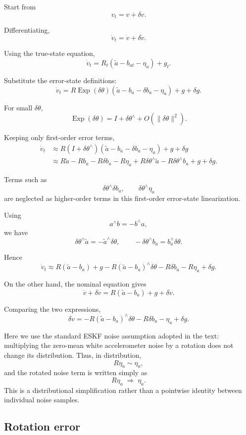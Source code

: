 \documentclass[11pt]{article}
\numberwithin{equation}{section}
\newcommand{\Exp}{\operatorname{Exp}}
\begin{document}
Start from
\[
v_t=v+\delta v.
\]

Differentiating,
\[
\dot v_t=\dot v+\delta\dot v.
\]

Using the true-state equation,
\[
\dot v_t
=
R_t(\tilde a-b_{at}-\eta_a)+g_t.
\]

Substitute the error-state definitions:
\[
\dot v_t
=
R\Exp(\delta\theta)
(\tilde a-b_a-\delta b_a-\eta_a)
+g+\delta g.
\]

For small $\delta\theta$,
\[
\Exp(\delta\theta)
=
I+\delta\theta^\wedge
+O(\|\delta\theta\|^2).
\]

Keeping only first-order error terms,
\begin{align}
\dot v_t
&\approx
R(I+\delta\theta^\wedge)
(\tilde a-b_a-\delta b_a-\eta_a)
+g+\delta g\\
&\approx
R\tilde a-Rb_a-R\delta b_a-R\eta_a
+R\delta\theta^\wedge\tilde a
-R\delta\theta^\wedge b_a
+g+\delta g.
\end{align}

Terms such as
\[
\delta\theta^\wedge\delta b_a,
\qquad
\delta\theta^\wedge\eta_a
\]
are neglected as higher-order terms in this first-order error-state
linearization.

Using
\[
a^\wedge b=-b^\wedge a,
\]
we have
\[
\delta\theta^\wedge\tilde a
=
-\tilde a^\wedge\delta\theta,
\qquad
-\delta\theta^\wedge b_a
=
b_a^\wedge\delta\theta.
\]

Hence
\[
\dot v_t
\approx
R(\tilde a-b_a)+g
-R(\tilde a-b_a)^\wedge\delta\theta
-R\delta b_a
-R\eta_a
+\delta g.
\]

On the other hand, the nominal equation gives
\[
\dot v+\delta\dot v
=
R(\tilde a-b_a)+g+\delta\dot v.
\]

Comparing the two expressions,
\begin{equation}
\boxed{
\delta\dot v
=
-R(\tilde a-b_a)^\wedge\delta\theta
-R\delta b_a
-\eta_a
+\delta g.
}
\end{equation}

Here we use the standard ESKF noise assumption adopted in the text:
multiplying the zero-mean white accelerometer noise by a rotation does
not change its distribution. Thus, in distribution,
\[
R\eta_a \sim \eta_a,
\]
and the rotated noise term is written simply as
\[
R\eta_a \;\Rightarrow\; \eta_a.
\]
This is a distributional simplification rather than a pointwise identity
between individual noise samples.

\subsection{Rotation error}
\end{document}
